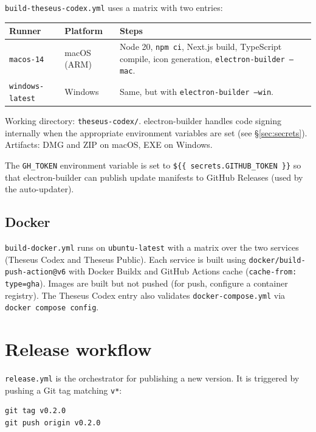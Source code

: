 \documentclass[11pt,letterpaper]{article}
\newcommand{\file}[1]{\texttt{#1}}
\newcommand{\cmd}[1]{\texttt{#1}}
\begin{document}
\file{build-theseus-codex.yml} uses a matrix with two entries:

\begin{table}[h]
\small
\begin{tabular}{p{3cm} p{3cm} p{8.5cm}}
\toprule
\textbf{Runner} & \textbf{Platform} & \textbf{Steps} \\
\midrule
\cmd{macos-14} & macOS (ARM) & Node 20, \cmd{npm ci}, Next.js build, TypeScript compile, icon generation, \cmd{electron-builder --mac}. \\
\cmd{windows-latest} & Windows & Same, but with \cmd{electron-builder --win}. \\
\bottomrule
\end{tabular}
\end{table}

Working directory: \file{theseus-codex/}. electron-builder handles code signing internally when the appropriate environment variables are set (see \S\ref{sec:secrets}). Artifacts: DMG and ZIP on macOS, EXE on Windows.

The \cmd{GH\_TOKEN} environment variable is set to \cmd{\$\{\{ secrets.GITHUB\_TOKEN \}\}} so that electron-builder can publish update manifests to GitHub Releases (used by the auto-updater).

\subsection{Docker}

\file{build-docker.yml} runs on \cmd{ubuntu-latest} with a matrix over the two services (Theseus Codex and Theseus Public). Each service is built using \cmd{docker/build-push-action@v6} with Docker Buildx and GitHub Actions cache (\cmd{cache-from: type=gha}). Images are built but not pushed (for push, configure a container registry). The Theseus Codex entry also validates \cmd{docker-compose.yml} via \cmd{docker compose config}.

\section{Release workflow}

\file{release.yml} is the orchestrator for publishing a new version. It is triggered by pushing a Git tag matching \cmd{v*}:

\begin{lstlisting}
git tag v0.2.0
git push origin v0.2.0
\end{lstlisting}
\end{document}
